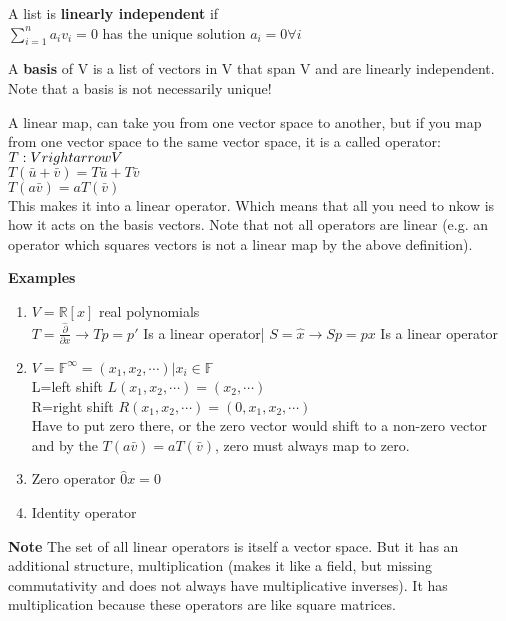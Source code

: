 \documentclass{article}
\begin{document}
{\vspace{5mm}

A list is \textbf{linearly independent} if \\
$\sum_{i=1}^na_iv_i=0$ has the unique solution $a_i=0 \forall i$

\vspace{5mm}

A \textbf{basis} of V is a list of vectors in V that span V and are linearly independent. Note that a basis is not necessarily unique!

\vspace{5mm}
A linear map, can take you from one vector space to another, but if you map from one vector space to the same vector space, it is a called operator:\\
$T:V\\rightarrowV$\\
$T(\bar{u}+\bar{v})=T\bar{u}+T\bar{v}$\\
$T(a\bar{v})=aT(\bar{v})$\\
This makes it into a linear operator. Which means that all you need to nkow is how it acts on the basis vectors. Note that not all operators are linear (e.g. an operator which squares vectors is not a linear map by the above definition).

\vspace{5mm}
\textbf{Examples}
\begin{enumerate}
\item $V=\mathbb{R}[x]$ real polynomials\\
$T=\frac{\hat{\partial}}{\partial x} \rightarrow Tp=p'$ Is a linear operator|
$S=\hat{x} \rightarrow Sp=px$ Is a linear operator
\item $V=\mathbb{F}^\infty={(x_1,x_2,\cdots)\vert x_i \in \mathbb{F}}$\\
L=left shift \hspace{10mm} $L(x_1,x_2, \cdots)=(x_2,\cdots)$\\
R=right shift \hspace{10mm} $R(x_1,x_2,\cdots)=(0,x_1,x_2,\cdots)$\\
Have to put zero there, or the zero vector would shift to a non-zero vector and by the $T(a\bar{v})=aT(\bar{v})$, zero must always map to zero. 
\item Zero operator $\hat{0}x=0$
\item Identity operator 
\end{enumerate}

\vspace{5mm}
\textbf{Note} The set of all linear operators is itself a vector space. But it has an additional structure, multiplication (makes it like a field, but missing commutativity and does not always have multiplicative inverses). It has multiplication because these operators are like square matrices. 

}
\end{document}
